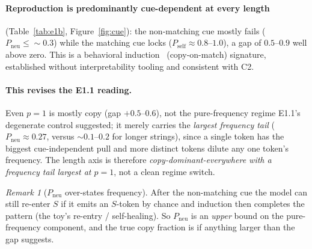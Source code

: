 \documentclass[11pt]{article}
\theoremstyle{plain}
\theoremstyle{definition}
\theoremstyle{remark}
\newtheorem{remark}{Remark}
\newcommand{\Pself}{P_{\mathrm{self}}}
\newcommand{\Pneu}{P_{\mathrm{neu}}}
\begin{document}
\paragraph{Reproduction is predominantly cue-dependent at every length}
(Table~\ref{tab:e1b}, Figure~\ref{fig:cue}): the non-matching cue mostly fails
($\Pneu\le\!\sim\!0.3$) while the matching cue locks ($\Pself\approx0.8$--$1.0$), a gap of
$0.5$--$0.9$ well above zero. This is a behavioral induction~\cite{olsson2022}
(copy-on-match) signature, established without interpretability tooling and consistent with C2.

\paragraph{This revises the E1.1 reading.} Even $p{=}1$ is mostly copy (gap $+0.5$--$0.6$),
not the pure-frequency regime E1.1's degenerate control suggested; it merely carries the
\emph{largest frequency tail} ($\Pneu\approx0.27$, versus $\sim0.1$--$0.2$ for longer
strings), since a single token has the biggest cue-independent pull and more distinct tokens
dilute any one token's frequency. The length axis is therefore
\emph{copy-dominant-everywhere with a frequency tail largest at $p{=}1$}, not a clean regime
switch.

\begin{remark}[$\Pneu$ over-states frequency]
After the non-matching cue the model can still re-enter $S$ if it emits an $S$-token by
chance and induction then completes the pattern (the toy's re-entry / self-healing). So
$\Pneu$ is an \emph{upper} bound on the pure-frequency component, and the true copy fraction
is if anything larger than the gap suggests.
\end{remark}

\end{document}
